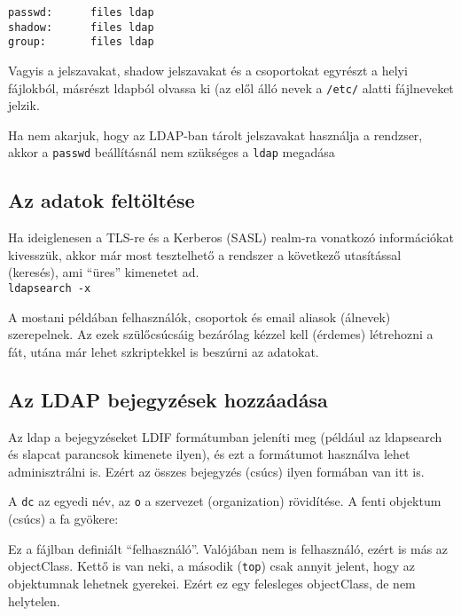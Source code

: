 \begin{Verbatim}[frame=single]
passwd:      files ldap
shadow:      files ldap
group:       files ldap
\end{Verbatim}

Vagyis a jelszavakat, shadow jelszavakat és a csoportokat egyrészt a helyi fájlokból, másrészt ldapból olvassa ki (az
elől álló nevek a \texttt{/etc/} alatti fájlneveket jelzik.

Ha nem akarjuk, hogy az LDAP-ban tárolt jelszavakat használja a rendzser, akkor a \texttt{passwd} beállításnál nem
szükséges a \texttt{ldap} megadása

\subsection{Az adatok feltöltése}
Ha ideiglenesen a TLS-re és a Kerberos (SASL) realm-ra vonatkozó információkat kivesszük, akkor már most tesztelhető a
rendszer a következő utasítással (keresés), ami ``üres'' kimenetet ad.\\
\texttt{ldapsearch -x}

A mostani példában felhasználók, csoportok és email aliasok (álnevek) szerepelnek. Az ezek szülőcsúcsáig bezárólag
kézzel kell (érdemes) létrehozni a fát, utána már lehet szkriptekkel is beszúrni az adatokat.



\subsection{Az LDAP bejegyzések hozzáadása}

Az ldap a bejegyzéseket LDIF formátumban jeleníti meg (például az ldapsearch és slapcat parancsok kimenete ilyen), és
ezt a formátumot használva lehet adminisztrálni is. Ezért az összes bejegyzés (csúcs) ilyen formában van itt is.

A \texttt{dc} az egyedi név, az \texttt{o} a szervezet (organization) rövidítése. A fenti objektum (csúcs) a fa
gyökere:



Ez a  fájlban definiált ``felhasználó''. Valójában nem is felhasználó, ezért is más az
objectClass. Kettő is van neki, a második (\texttt{top}) csak annyit jelent, hogy az objektumnak lehetnek
gyerekei. Ezért ez egy felesleges objectClass, de nem helytelen.


